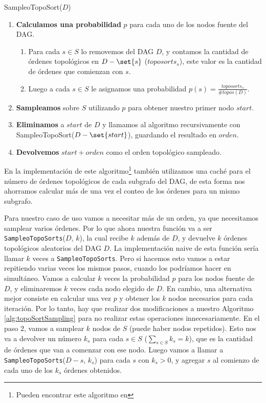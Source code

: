 \begin{algorithm}
\caption{SampleoTopoSort($D$)} \label{alg:topoSortSampling}
\begin{enumerate}
    \item \textbf{Calculamos una probabilidad} $p$ para cada uno de los nodos fuente del DAG.
        \begin{enumerate}
            \item Para cada $s \in S$ lo removemos del DAG $D$, y contamos la cantidad de órdenes topológicos en $D-\set{s}$ ($toposorts_s$), este valor es la cantidad de órdenes que comienzan con $s$.
            \item Luego a cada $s \in S$ le asignamos una probabilidad $p(s)= \frac{toposorts_s}{\#topos(D)}$. 
        \end{enumerate}
    \item \textbf{Sampleamos} sobre $S$ utilizando $p$ para obtener nuestro primer nodo $start$.
    \item \textbf{Eliminamos} a $start$ de $D$ y llamamos al algoritmo recursivamente con  SampleoTopoSort($D-\set{start}$), guardando el resultado en $orden$. 
    \item \textbf{Devolvemos} $start + orden$ como el orden topológico sampleado. 
\end{enumerate}
\end{algorithm}


En la implementación de este algoritmo\footnote{Pueden encontrar este algoritmo en } también utilizamos una caché para el número de órdenes topológicos de cada subgrafo del DAG, de esta forma nos ahorramos calcular más de una vez el conteo de los órdenes para un mismo subgrafo.

Para nuestro caso de uso vamos a necesitar más de un orden, ya que necesitamos samplear varios órdenes. Por lo que ahora nuestra función va a ser \texttt{SampleoTopoSorts}($D$, $k$), la cual recibe $k$ además de $D$, y devuelve $k$ órdenes topológicos aleatorios del DAG $D$. La implementación naive de esta función sería llamar $k$ veces a \texttt{SampleoTopoSorts}. Pero si hacemos esto vamos a estar repitiendo varias veces los mismos pasos, cuando los podríamos hacer en simultáneo. Vamos a calcular $k$ veces la probabilidad $p$ para los nodos fuente de $D$, y eliminaremos $k$ veces cada nodo elegido de $D$. En cambio, una alternativa mejor consiste en calcular una vez $p$ y obtener los $k$ nodos necesarios para cada iteración. 
Por lo tanto, hay que realizar dos modificaciones a nuestro Algoritmo \ref{alg:topoSortSampling} para no realizar estas operaciones innecesariamente. En  el paso $2$, vamos a samplear $k$ nodos de $S$ (puede haber nodos repetidos). Esto nos va a devolver un número $k_s$ para cada $s \in S$ ($\sum_{s \in S} k_s = k$), que es la cantidad de órdenes que van a comenzar con ese nodo. Luego vamos a llamar a \texttt{SampleoTopoSorts}($D-{s}$, $k_s$) para cada $s$ con $k_s > 0$, y agregar $s$ al comienzo de cada uno de los $k_s$ órdenes obtenidos. 

